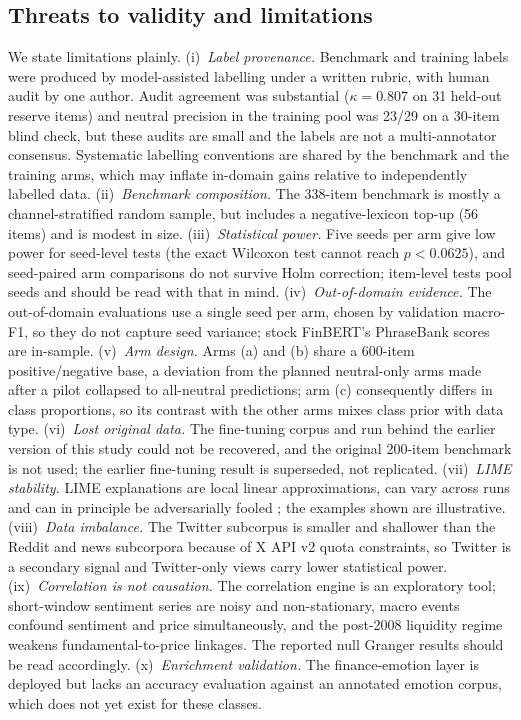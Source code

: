 \documentclass{aims}
\numberwithin{equation}{section}
\begin{document}
\subsection{Threats to validity and limitations}
We state limitations plainly. (i)~\emph{Label provenance.} Benchmark and training
labels were produced by model-assisted labelling under a written rubric, with human
audit by one author. Audit agreement was substantial \citep{landis1977} ($\kappa = 0.807$ on 31
held-out reserve items) and neutral precision in the training pool was 23/29 on a 30-item blind
check, but these audits are small and the labels are not a multi-annotator
consensus. Systematic labelling conventions are shared by the benchmark and the
training arms, which may inflate in-domain gains relative to independently labelled
data. (ii)~\emph{Benchmark composition.} The 338-item benchmark is mostly a
channel-stratified random sample, but includes a negative-lexicon top-up (56 items)
and is modest in size. (iii)~\emph{Statistical power.} Five seeds per arm give low
power for seed-level tests (the exact Wilcoxon test cannot reach $p < 0.0625$), and
seed-paired arm comparisons do not survive Holm correction; item-level tests pool
seeds and should be read with that in mind. (iv)~\emph{Out-of-domain evidence.} The
out-of-domain evaluations use a single seed per arm, chosen by validation macro-F1,
so they do not capture seed variance; stock FinBERT's PhraseBank scores are
in-sample. (v)~\emph{Arm design.} Arms (a) and (b) share a 600-item
positive/negative base, a deviation from the planned neutral-only arms made after a
pilot collapsed to all-neutral predictions; arm (c) consequently differs in class
proportions, so its contrast with the other arms mixes class prior with data type.
(vi)~\emph{Lost original data.} The fine-tuning corpus and run behind the earlier
version of this study could not be recovered, and the original 200-item benchmark
is not used; the earlier fine-tuning result is superseded, not replicated.
(vii)~\emph{LIME stability.} LIME explanations are local linear approximations, can
vary across runs and can in principle be adversarially fooled \citep{slack2020};
the examples shown are illustrative. (viii)~\emph{Data imbalance.} The
Twitter subcorpus is smaller and shallower than the Reddit and news subcorpora
because of X API v2 quota constraints, so Twitter is a secondary signal and
Twitter-only views carry lower statistical power. (ix)~\emph{Correlation is not
causation.} The correlation engine is an exploratory tool; short-window sentiment
series are noisy and non-stationary, macro events confound sentiment and price
simultaneously, and the post-2008 liquidity regime weakens fundamental-to-price
linkages. The reported null Granger results should be read accordingly.
(x)~\emph{Enrichment validation.} The finance-emotion layer is deployed but lacks an
accuracy evaluation against an annotated emotion corpus, which does not yet exist for
these classes.
\end{document}
